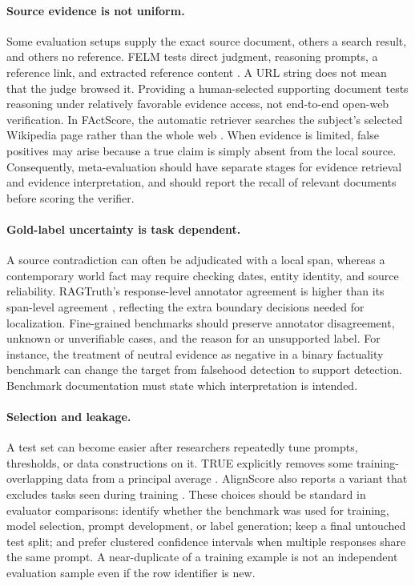 \documentclass[11pt]{article}
\begin{document}
\paragraph{Source evidence is not uniform.} Some evaluation setups supply the exact source document, others a search result, and others no reference. FELM tests direct judgment, reasoning prompts, a reference link, and extracted reference content \citep{C13}. A URL string does not mean that the judge browsed it. Providing a human-selected supporting document tests reasoning under relatively favorable evidence access, not end-to-end open-web verification. In FActScore, the automatic retriever searches the subject's selected Wikipedia page rather than the whole web \citep{C07}. When evidence is limited, false positives may arise because a true claim is simply absent from the local source. Consequently, meta-evaluation should have separate stages for evidence retrieval and evidence interpretation, and should report the recall of relevant documents before scoring the verifier.

\paragraph{Gold-label uncertainty is task dependent.} A source contradiction can often be adjudicated with a local span, whereas a contemporary world fact may require checking dates, entity identity, and source reliability. RAGTruth's response-level annotator agreement is higher than its span-level agreement \citep{C12}, reflecting the extra boundary decisions needed for localization. Fine-grained benchmarks should preserve annotator disagreement, unknown or unverifiable cases, and the reason for an unsupported label. For instance, the treatment of neutral evidence as negative in a binary factuality benchmark can change the target from falsehood detection to support detection. Benchmark documentation must state which interpretation is intended.

\paragraph{Selection and leakage.} A test set can become easier after researchers repeatedly tune prompts, thresholds, or data constructions on it. TRUE explicitly removes some training-overlapping data from a principal average \citep{C11}. AlignScore also reports a variant that excludes tasks seen during training \citep{C09}. These choices should be standard in evaluator comparisons: identify whether the benchmark was used for training, model selection, prompt development, or label generation; keep a final untouched test split; and prefer clustered confidence intervals when multiple responses share the same prompt. A near-duplicate of a training example is not an independent evaluation sample even if the row identifier is new.
\end{document}
